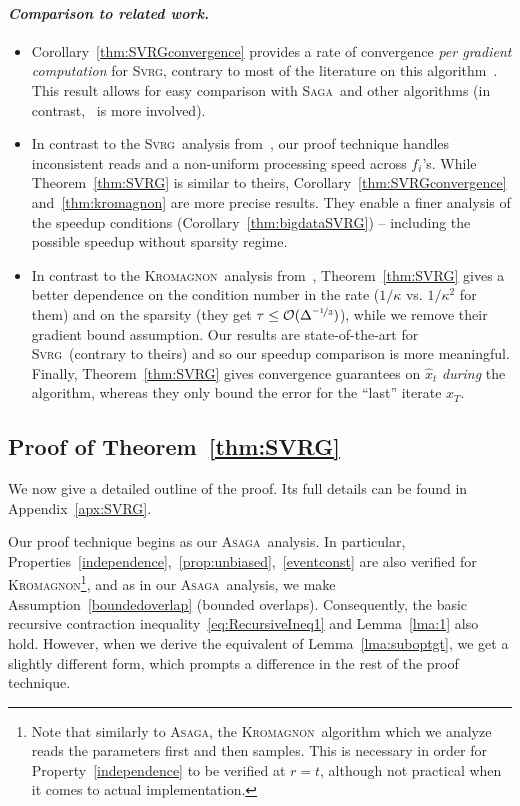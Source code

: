 \documentclass[twoside, 11pt]{article}
\newcommand{\overlap}{\tau}
\newcommand{\sparsity}{\Delta}
\newcommand{\ASAGA}{\textsc{Asaga}}
\newcommand{\SAGA}{\textsc{Saga}}
\newcommand{\SVRG}{\textsc{Svrg}}
\newcommand{\KROMAGNON}{\textsc{Kromagnon}}
\begin{document}
\paragraph{\textit{Comparison to related work.}}
\begin{itemize}[topsep=1mm, itemsep=-1mm]
	\item Corollary~\ref{thm:SVRGconvergence} provides a rate of convergence \emph{per gradient computation} for \SVRG, contrary to most of the literature on this algorithm~\citep[including the seminal paper][]{svrg}.
	This result allows for easy comparison with \SAGA\ and other algorithms (in contrast,~\citealt{s2gd} is more involved).
	\item In contrast to the \SVRG\ analysis from~\citet[Thm. 2]{smola}, our proof technique handles inconsistent reads and a non-uniform processing speed across $f_i$'s.
	While Theorem~\ref{thm:SVRG} is similar to theirs, Corollary~\ref{thm:SVRGconvergence} and~\ref{thm:kromagnon} are more precise results.
	They enable a finer analysis of the speedup conditions (Corollary~\ref{thm:bigdataSVRG}) -- including the possible speedup without sparsity regime.
	\item In contrast to the \KROMAGNON\ analysis from~\citet[Thm. 14]{mania}, Theorem~\ref{thm:SVRG} gives a better dependence on the condition number in the rate ($1/\kappa$ vs. $1/\kappa^2$ for them) and on the sparsity (they get $\overlap \leq \mathcal{O}(\sparsity^{\nicefrac{-1}{3}})$), while we remove their gradient bound assumption.
	Our results are state-of-the-art for \SVRG\ (contrary to theirs) and so our speedup comparison is more meaningful.
	Finally, Theorem~\ref{thm:SVRG} gives convergence guarantees on $\hat{x}_t$ \emph{during} the algorithm, whereas they only bound the error for the ``last'' iterate $x_T$.
\end{itemize}

\subsection{Proof of Theorem~\ref{thm:SVRG}}\label{sec:proofSVRG}
We now give a detailed outline of the proof. Its full details can be found in Appendix~\ref{apx:SVRG}.

Our proof technique begins as our \ASAGA\ analysis.
In particular, Properties~\ref{independence},~\ref{prop:unbiased},~\ref{eventconst} are also verified for \KROMAGNON\footnote{Note that similarly to \ASAGA, the \KROMAGNON\ algorithm which we analyze reads the parameters first and then samples. This is necessary in order for Property~\ref{independence} to be verified at $r=t$, although not practical when it comes to actual implementation.}, and as in our \ASAGA\ analysis, we make Assumption~\ref{boundedoverlap} (bounded overlaps).
Consequently, the basic recursive contraction inequality~\eqref{eq:RecursiveIneq1} and Lemma~\ref{lma:1} also hold.
However, when we derive the equivalent of Lemma~\ref{lma:suboptgt}, we get a slightly different form, which prompts a difference in the rest of the proof technique.
\end{document}
